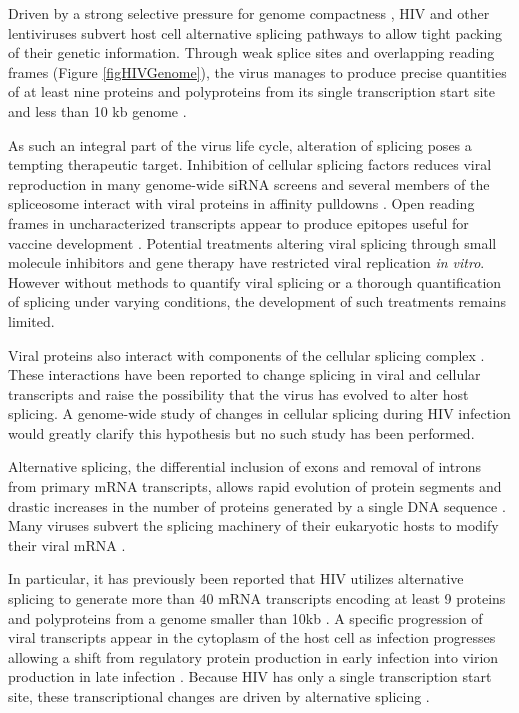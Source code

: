 \documentclass[../sherrill-Mix_thesis.tex]{subfiles}
\begin{document}
	Driven by a strong selective pressure for genome compactness \citep{Gelinas1986,Herman1987,Shin2000}, HIV and other lentiviruses subvert host cell alternative splicing pathways to allow tight packing of their genetic information. Through weak splice sites and overlapping reading frames (Figure \ref{figHIVGenome}), the virus manages to produce precise quantities of at least nine proteins and polyproteins from its single transcription start site and less than 10 kb genome \citep{Stoltzfus2009}. 

	As such an integral part of the virus life cycle\citep{Kim1989,Pomerantz1990}, alteration of splicing poses a tempting therapeutic target. Inhibition of cellular splicing factors reduces viral reproduction in many genome-wide siRNA screens \citep{Brass2008,Konig2008,Bushman2009} and several members of the spliceosome interact with viral proteins in affinity pulldowns \citep{Jager2012}. Open reading frames in uncharacterized transcripts appear to produce epitopes useful for vaccine development \citep{Bansal2010}. Potential treatments altering viral splicing through small molecule inhibitors \citep{Fukuhara2006,Bakkour2007} and gene therapy \citep{Asparuhova2007,Mandal2010} have restricted viral replication \emph{in vitro}. However without methods to quantify viral splicing or a thorough quantification of splicing under varying conditions, the development of such treatments remains limited. 

	Viral proteins also interact with components of the cellular splicing complex \citep{Tange1996,Berro2006,Jager2012}. These interactions have been reported to change splicing in viral\citep{Berro2006,Bohne2007,Jablonski2010} and cellular transcripts \citep{Kuramitsu2005,Hashizume2007} and raise the possibility that the virus has evolved to alter host splicing. A genome-wide study of changes in cellular splicing during HIV infection would greatly clarify this hypothesis but no such study has been performed. 

	Alternative splicing, the differential inclusion of exons and removal of introns from primary mRNA transcripts, allows rapid evolution of protein segments \citep{Kopelman2005,Xing2005,Su2006} and drastic increases in the number of proteins generated by a single DNA sequence \citep{Watson2005}. Many viruses subvert the splicing machinery of their eukaryotic hosts to modify their viral mRNA \citep{Pollard1998}. 

	In particular, it has previously been reported that HIV utilizes alternative splicing to generate more than 40 mRNA transcripts encoding at least 9 proteins and polyproteins from a genome smaller than 10kb \citep{Purcell1993}. A specific progression of viral transcripts appear in the cytoplasm of the host cell as infection progresses allowing a shift from regulatory protein production in early infection into virion production in late infection \citep{Kim1989,Pomerantz1990,Klotman1991}. Because HIV has only a single transcription start site, these transcriptional changes are driven by alternative splicing \citep{Stoltzfus2009}. 
\end{document}

